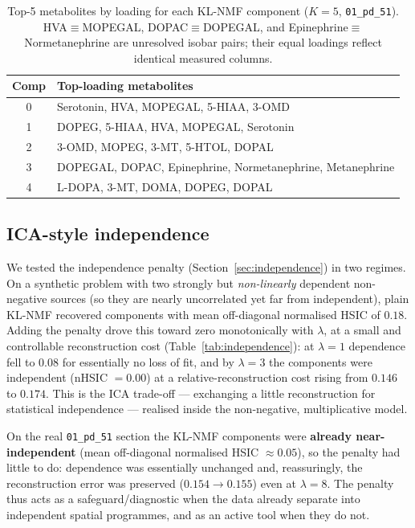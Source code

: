\documentclass[11pt]{article}
\newcommand{\code}[1]{\texttt{#1}}
\begin{document}
\begin{table}[t]
  \centering
  \caption{Top-5 metabolites by loading for each KL-NMF component ($K = 5$,
  \code{01\_pd\_51}). HVA$\equiv$MOPEGAL, DOPAC$\equiv$DOPEGAL, and
  Epinephrine$\equiv$Normetanephrine are unresolved isobar pairs; their equal loadings
  reflect identical measured columns.}
  \label{tab:loadings}
  \begin{tabular}{cl}
    \toprule
    Comp & Top-loading metabolites \\
    \midrule
    0 & Serotonin, HVA, MOPEGAL, 5-HIAA, 3-OMD \\
    1 & DOPEG, 5-HIAA, HVA, MOPEGAL, Serotonin \\
    2 & 3-OMD, MOPEG, 3-MT, 5-HTOL, DOPAL \\
    3 & DOPEGAL, DOPAC, Epinephrine, Normetanephrine, Metanephrine \\
    4 & L-DOPA, 3-MT, DOMA, DOPEG, DOPAL \\
    \bottomrule
  \end{tabular}
\end{table}

\subsection{ICA-style independence}
\label{sec:ica}

We tested the independence penalty (Section~\ref{sec:independence}) in two regimes. On a
synthetic problem with two strongly but \emph{non-linearly} dependent non-negative sources
(so they are nearly uncorrelated yet far from independent), plain KL-NMF recovered components
with mean off-diagonal normalised HSIC of $0.18$. Adding the penalty drove this toward zero
monotonically with $\lambda$, at a small and controllable reconstruction cost
(Table~\ref{tab:independence}): at $\lambda = 1$ dependence fell to $0.08$ for essentially no
loss of fit, and by $\lambda = 3$ the components were independent (nHSIC $= 0.00$) at a
relative-reconstruction cost rising from $0.146$ to $0.174$. This is the ICA trade-off ---
exchanging a little reconstruction for statistical independence --- realised inside the
non-negative, multiplicative model.

On the real \code{01\_pd\_51} section the KL-NMF components were \textbf{already
near-independent} (mean off-diagonal normalised HSIC $\approx 0.05$), so the penalty had
little to do: dependence was essentially unchanged and, reassuringly, the reconstruction
error was preserved ($0.154 \to 0.155$) even at $\lambda = 8$. The penalty thus acts as a
safeguard/diagnostic when the data already separate into independent spatial programmes, and
as an active tool when they do not.
\end{document}
